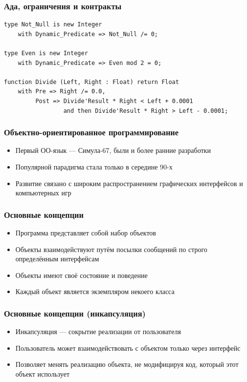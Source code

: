 \documentclass[xetex,mathserif,serif]{beamer}
\begin{document}
	\begin{frame}[fragile]
		\frametitle{Ада, ограничения и контракты}
		\begin{verbatim}
type Not_Null is new Integer
    with Dynamic_Predicate => Not_Null /= 0;

type Even is new Integer
    with Dynamic_Predicate => Even mod 2 = 0;

function Divide (Left, Right : Float) return Float
    with Pre => Right /= 0.0,
         Post => Divide'Result * Right < Left + 0.0001
                 and then Divide'Result * Right > Left - 0.0001;
		\end{verbatim}
	\end{frame}

	\begin{frame}
		\frametitle{Объектно-ориентированное программирование}
		\begin{itemize}
			\item Первый ОО-язык --- Симула-67, были и более ранние разработки
			\item Популярной парадигма стала только в середине 90-х
			\item Развитие связано с широким распространением графических интерфейсов и компьютерных игр
		\end{itemize}
	\end{frame}

	\begin{frame}
		\frametitle{Основные концепции}
		\begin{itemize}
			\item Программа представляет собой набор объектов
			\item Объекты взаимодействуют путём посылки сообщений по строго определённым интерфейсам
			\item Объекты имеют своё состояние и поведение
			\item Каждый объект является экземпляром некоего класса
		\end{itemize}
	\end{frame}

	\begin{frame}
		\frametitle{Основные концепции (инкапсуляция)}
		\begin{itemize}
			\item Инкапсуляция --- сокрытие реализации от пользователя
			\item Пользователь может взаимодействовать с объектом только через интерфейс
			\item Позволяет менять реализацию объекта, не модифицируя код, который этот объект использует
		\end{itemize}
	\end{frame}
\end{document}
